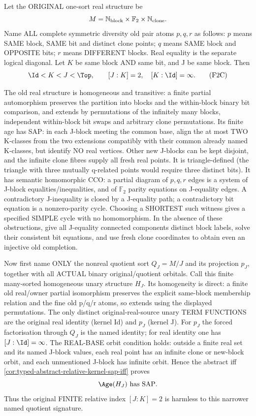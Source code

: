 \begin{example}
\label{ex:typed-term-visible-index-two-hidden-sap}
Let the ORIGINAL one-sort
real structure be
\[
            M=\mathbb N_{\rm block}
               \times\mathbb F_2
               \times\mathbb N_{\rm clone}.
\]
Name ALL complete symmetric
diversity old pair atoms
$p,q,r$ as follows:
$p$ means SAME block,
SAME bit and distinct
clone points;
$q$ means SAME block
and OPPOSITE bits;
$r$ means DIFFERENT
blocks. Real equality
is the separate
logical diagonal.
Let $K$ be same block
AND same bit, and J
be same block.
Then
\[
  \Id<K<J<\Top,\qquad
  [J:K]=2,
  \quad [K:\Id]=\infty.
\tag{F2C}\label{eq:typed-term-visible-two-cover}
\]

The old real structure
is homogeneous and
transitive: a finite
partial automorphism
preserves the partition
into blocks and the
within-block binary
bit comparison, and
extends by permutations
of the infinitely many
blocks, independent
within-block bit swaps
and arbitrary clone
permutations.
Its finite age has SAP:
in each J-block meeting
the common base, align
the at most TWO
K-classes from the two
extensions compatibly
with their common
already named K-classes,
but identify NO real
vertices. Other new
J-blocks can be kept
disjoint, and the
infinite clone fibres
supply all fresh real
points. It is
triangle-defined
(the triangle with
three mutually
q-related points
would require three
distinct bits).
It has semantic
homomorphic CCO:
a partial diagram of
$p,q,r$ edges is a
system of J-block
equalities/inequalities,
and of $\mathbb F_2$
parity equations
on J-equality edges.
A contradictory
J-inequality is closed
by a J-equality path;
a contradictory bit
equation is a
nonzero-parity cycle.
Choosing a SHORTEST
such witness gives a
specified SIMPLE cycle
with no homomorphism.
In the absence of
these obstructions,
give all J-equality
connected components
distinct block labels,
solve their consistent
bit equations, and use
fresh clone coordinates
to obtain even an
injective old completion.

Now first name ONLY the
nonreal quotient sort
$Q_J=M/J$ and its
projection $p_J$,
together with all ACTUAL
binary original/quotient
orbitals. Call this
finite many-sorted
homogeneous unary
structure $H_J$.
Its homogeneity is direct:
a finite old real/owner
partial isomorphism
preserves the explicit
same-block membership
relation and the fine
old p/q/r atoms, so
extends using the
displayed permutations.
The only distinct
original-real-source
unary TERM FUNCTIONS
are the original real
identity (kernel Id)
and $p_J$ (kernel J).
For $p_J$ the forced
factorisation through
$Q_J$ is the named
identity; for real
identity one has
$[J:\Id]=\infty$.
The REAL-BASE orbit
condition holds:
outside a finite real
set and its named
J-block values,
each real point has
an infinite clone
or new-block orbit,
and each unmentioned
J-block has infinite
orbit. Hence the
abstract iff
\cref{cor:typed-abstract-relative-kernel-sap-iff}
proves
\[
                 \Age(H_J)\text{ has SAP}.
\]
Thus the original
FINITE relative index
$[J:K]=2$ is harmless
to this narrower named
quotient signature.


\end{example}
